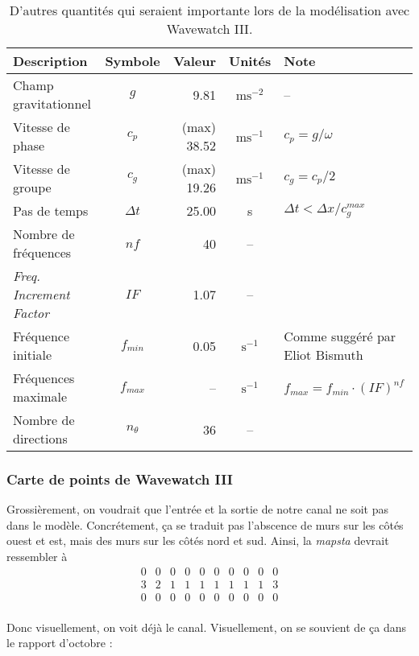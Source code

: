 \documentclass[10pt]{article}
\numberwithin{equation}{section}
\begin{document}
\begin{table}[!h]
\caption{D'autres quantités qui seraient importante lors de la modélisation avec Wavewatch III.}
\centering
\begin{tabular}{lcrcl}
\hline
\hline
Description & Symbole & Valeur & Unités & Note\\
\hline
Champ gravitationnel & \(g\) & 9.81 & \(\mathrm{ms}^{-2}\) & --\\
Vitesse de phase & \(c_p\) & (max) 38.52 & \(\mathrm{ms}^{-1}\) & \(c_p = g/\omega\)\\
Vitesse de groupe & \(c_g\) & (max) 19.26 & \(\mathrm{ms}^{-1}\) & \(c_g = c_p/2\)\\
Pas de temps & \(\Delta t\) & 25.00 & s & \(\Delta t < \Delta x/c^{max}_g\)\\
\hline
Nombre de fréquences & \(nf\) & 40 & -- & \autocite[Voir][switch NL2]{wwiii2016user}\\
\emph{Freq. Increment Factor} & \(IF\) & 1.07 & -- & \autocite[Voir][switch NL2]{wwiii2016user}\\
Fréquence initiale & \(f_{min}\) & 0.05 & \(\mathrm{s}^{-1}\) & Comme suggéré par Eliot Bismuth\\
Fréquences maximale & \(f_{max}\) & -- & \(\mathrm{s}^{-1}\) & \(f_{max} = f_{min}\cdot(IF)^{nf}\)\\
Nombre de directions & \(n_\theta\) & 36 & -- & \autocite[Voir][switch NL2]{wwiii2016user}\\
\hline
\end{tabular}
\end{table}
\subsubsection{Carte de points de Wavewatch III}
\label{sec:org0863776}

Grossièrement, on voudrait que l'entrée et la sortie de notre canal ne soit pas dans le modèle. Concrétement, ça se traduit pas l'abscence de murs sur les côtés ouest et est, mais des murs sur les côtés nord et sud. Ainsi, la \emph{mapsta} devrait ressembler à
\[
\begin{matrix}
 0 & 0 & 0 & 0 & 0 & 0 & 0 & 0 & 0 & 0 \\
 3 & 2 & 1 & 1 & 1 & 1 & 1 & 1 & 1 & 3 \\
 0 & 0 & 0 & 0 & 0 & 0 & 0 & 0 & 0 & 0 \\
\end{matrix}
\]

Donc visuellement, on voit déjà le canal. Visuellement, on se souvient de ça dans le rapport d'octobre :
\end{document}
